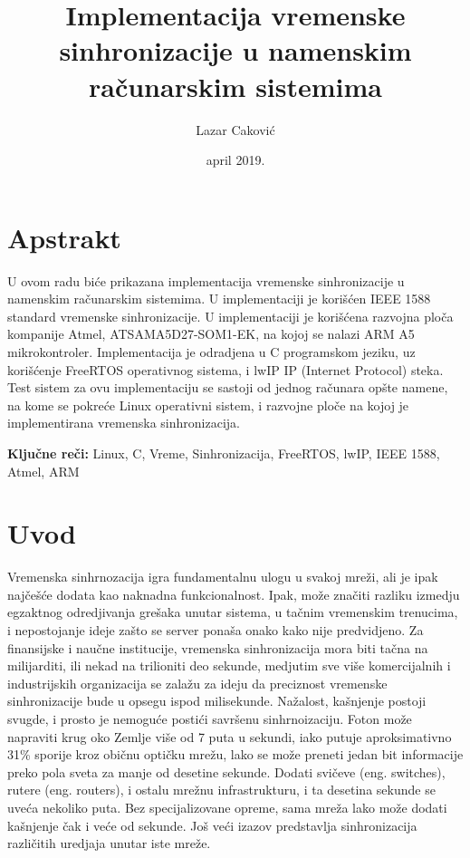 \documentclass[a4paper,12pt, master]{etf}
\title{Implementacija vremenske sinhronizacije u namenskim ra\v{c}unarskim sistemima}
\author{Lazar Caković}
\date{april 2019.}
\begin{document}
	\maketitle

	\tableofcontents

	\listoffigures

	\newpage

	\chapter*{Apstrakt}

    U ovom radu bi\'{c}e prikazana implementacija vremenske sinhronizacije u
	namenskim ra\v{c}unarskim sistemima. U implementaciji je kori\v{s}\'{c}en
	IEEE 1588 standard vremenske sinhronizacije. U implementaciji je
    kori\v{s}\'{c}ena razvojna plo\v{c}a kompanije Atmel, ATSAMA5D27-SOM1-EK, na
    kojoj se nalazi ARM A5 mikrokontroler. Implementacija je odradjena u C
    programskom jeziku, uz kori\v{s}\'{c}enje FreeRTOS operativnog sistema, i
    lwIP IP (Internet Protocol) steka. Test sistem za ovu implementaciju se
    sastoji od jednog ra\v{c}unara op\v{s}te namene, na kome se pokre\'{c}e
    Linux operativni sistem, i razvojne plo\v{c}e na kojoj je implementirana
    vremenska sinhronizacija.

	\vspace{2cm}

	\textbf{Klju\v{c}ne re\v{c}i:}
	Linux, C, Vreme, Sinhronizacija, FreeRTOS, lwIP, IEEE 1588, Atmel, ARM

	\newpage

	\chapter*{Uvod}

    Vremenska sinhrnozacija igra fundamentalnu ulogu u svakoj mre\v{z}i, ali je
	ipak naj\v{c}e\v{s}\'{c}e dodata kao naknadna funkcionalnost. Ipak,
	mo\v{z}e zna\v{c}iti razliku izmedju egzaktnog odredjivanja gre\v{s}aka
	unutar sistema, u ta\v{c}nim vremenskim trenucima, i nepostojanje ideje
	za\v{s}to se server pona\v{s}a onako kako nije predvidjeno. Za finansijske
	i nau\v{c}ne institucije, vremenska sinhronizacija mora biti ta\v{c}na na
	milijarditi, ili nekad na trilioniti deo sekunde, medjutim sve vi\v{s}e
	komercijalnih i industrijskih organizacija se zala\v{z}u za ideju da
	preciznost vremenske sinhronizacije bude u opsegu ispod milisekunde.
	Na\v{z}alost, ka\v{s}njenje postoji svugde, i prosto je nemogu\'{c}e
	posti\'{c}i savr\v{s}enu sinhrnoizaciju. Foton mo\v{z}e napraviti krug oko
	Zemlje vi\v{s}e od 7 puta u sekundi, iako putuje aproksimativno 31\%
	sporije kroz obi\v{c}nu opti\v{c}ku mre\v{z}u, lako se mo\v{z}e preneti
	jedan bit informacije preko pola sveta za manje od desetine sekunde. Dodati
	svi\v{c}eve (eng\@. switches), rutere (eng\@. routers), i ostalu mre\v{z}nu
    infrastrukturu, i ta desetina sekunde se uve\'{c}a nekoliko puta. Bez
    specijalizovane opreme, sama mre\v{z}a lako mo\v{z}e dodati ka\v{s}njenje
    \v{c}ak i ve\'{c}e od sekunde. Jo\v{s} ve\'{c}i izazov predstavlja
    sinhronizacija razli\v{c}itih uredjaja unutar iste mre\v{z}e.
\end{document}
